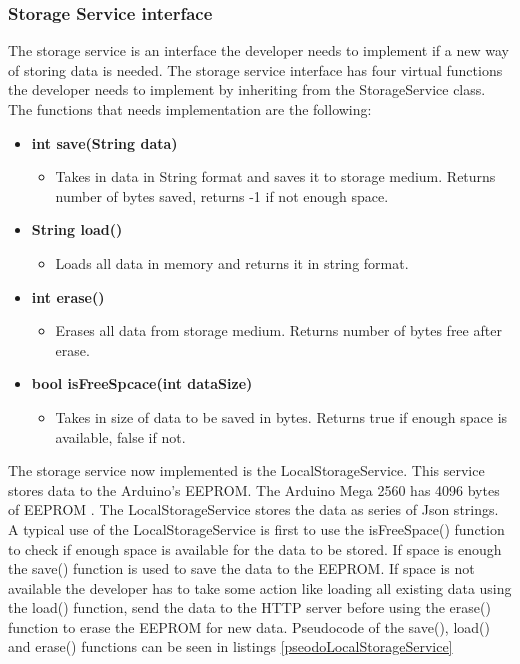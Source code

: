 \subsubsection{Storage Service interface}
The storage service is an interface the developer needs to implement if a new way of
storing data is needed. The storage service interface has four virtual functions the developer needs to implement by inheriting from the StorageService class. The functions that needs implementation are the following:
\begin{itemize}
    \item \textbf{int save(String data)}
        \begin{itemize}
            \item Takes in data in String format and saves it to storage medium. 
                  Returns number of bytes saved, returns -1 if not enough space.
        \end{itemize}
    \item \textbf{String load()}
        \begin{itemize}
            \item Loads all data in memory and returns it in string format.
        \end{itemize}
    \item \textbf{int erase()}
        \begin{itemize}
            \item Erases all data from storage medium. Returns number of bytes
                  free after erase.
        \end{itemize}
    \item \textbf{bool isFreeSpcace(int dataSize)}
        \begin{itemize}
            \item Takes in size of data to be saved in bytes. Returns true if enough 
                  space is available, false if not.
        \end{itemize}
\end{itemize}
The storage service now implemented is the LocalStorageService. This service stores data 
to the Arduino's EEPROM. The Arduino Mega 2560 has 4096 bytes of 
EEPROM \cite{arduinoMega}. The LocalStorageService stores the data as series of Json 
strings. A typical use of the LocalStorageService is first to use the isFreeSpace() function to check if enough space is available for the data to be stored. If space is enough the save() function is used to save the data to the EEPROM. If space is not available the developer has to take some action like loading all existing data using the load() function, send the data to the HTTP server before using the erase() function to erase the EEPROM for new data. Pseudocode of the save(), load() and erase() functions can be seen in listings \ref{pseodoLocalStorageService}

